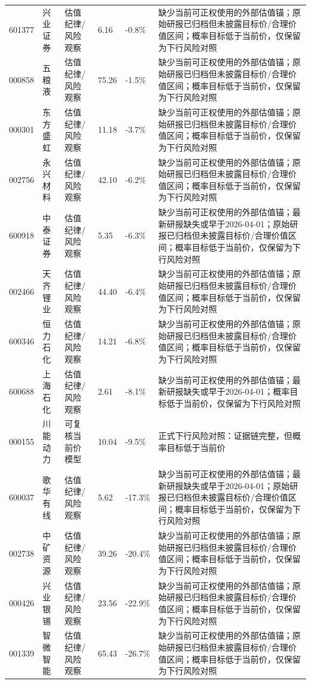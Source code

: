\begin{longtable}{L{1.0cm}L{1.6cm}L{2.5cm}R{1.1cm}R{1.0cm}L{7.0cm}}
601377 & 兴业证券 & 估值纪律/风险观察 & 6.16 & -0.8\% & 缺少当前可正权使用的外部估值锚；原始研报已归档但未披露目标价/合理价值区间；概率目标低于当前价，仅保留为下行风险对照 \\
000858 & 五粮液 & 估值纪律/风险观察 & 75.26 & -1.5\% & 缺少当前可正权使用的外部估值锚；原始研报已归档但未披露目标价/合理价值区间；概率目标低于当前价，仅保留为下行风险对照 \\
000301 & 东方盛虹 & 估值纪律/风险观察 & 11.18 & -3.7\% & 缺少当前可正权使用的外部估值锚；原始研报已归档但未披露目标价/合理价值区间；概率目标低于当前价，仅保留为下行风险对照 \\
002756 & 永兴材料 & 估值纪律/风险观察 & 42.10 & -6.2\% & 缺少当前可正权使用的外部估值锚；原始研报已归档但未披露目标价/合理价值区间；概率目标低于当前价，仅保留为下行风险对照 \\
600918 & 中泰证券 & 估值纪律/风险观察 & 5.35 & -6.3\% & 缺少当前可正权使用的外部估值锚；最新研报缺失或早于2026-04-01；原始研报已归档但未披露目标价/合理价值区间；概率目标低于当前价，仅保留为下行风险对照 \\
002466 & 天齐锂业 & 估值纪律/风险观察 & 44.40 & -6.4\% & 缺少当前可正权使用的外部估值锚；原始研报已归档但未披露目标价/合理价值区间；概率目标低于当前价，仅保留为下行风险对照 \\
600346 & 恒力石化 & 估值纪律/风险观察 & 14.21 & -6.8\% & 缺少当前可正权使用的外部估值锚；原始研报已归档但未披露目标价/合理价值区间；概率目标低于当前价，仅保留为下行风险对照 \\
600688 & 上海石化 & 估值纪律/风险观察 & 2.61 & -8.1\% & 缺少当前可正权使用的外部估值锚；最新研报缺失或早于2026-04-01；概率目标低于当前价，仅保留为下行风险对照 \\
000155 & 川能动力 & 可复核当前价模型 & 10.04 & -9.5\% & 正式下行风险对照：证据链完整，但概率目标低于当前价 \\
600037 & 歌华有线 & 估值纪律/风险观察 & 5.62 & -17.3\% & 缺少当前可正权使用的外部估值锚；最新研报缺失或早于2026-04-01；原始研报已归档但未披露目标价/合理价值区间；概率目标低于当前价，仅保留为下行风险对照 \\
002738 & 中矿资源 & 估值纪律/风险观察 & 39.26 & -20.4\% & 缺少当前可正权使用的外部估值锚；原始研报已归档但未披露目标价/合理价值区间；概率目标低于当前价，仅保留为下行风险对照 \\
000426 & 兴业银锡 & 估值纪律/风险观察 & 23.56 & -22.9\% & 缺少当前可正权使用的外部估值锚；原始研报已归档但未披露目标价/合理价值区间；概率目标低于当前价，仅保留为下行风险对照 \\
001339 & 智微智能 & 估值纪律/风险观察 & 65.43 & -26.7\% & 缺少当前可正权使用的外部估值锚；原始研报已归档但未披露目标价/合理价值区间；概率目标低于当前价，仅保留为下行风险对照 \\

\end{longtable}
